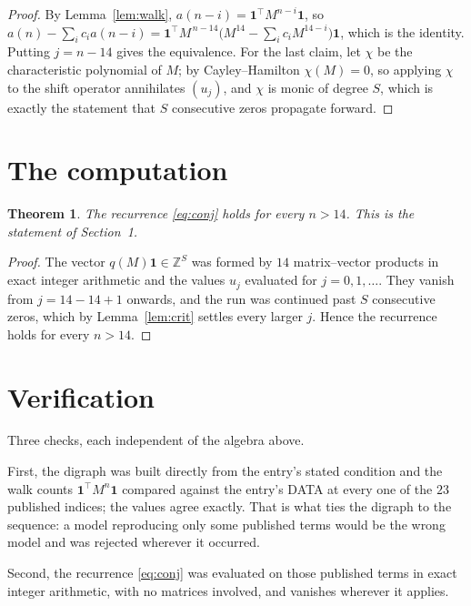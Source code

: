 \documentclass[11pt,a4paper]{article}
\theoremstyle{plain}
\newtheorem{theorem}{Theorem}
\theoremstyle{definition}
\begin{document}
\begin{proof}
By Lemma~\ref{lem:walk}, $a(n-i)=\mathbf{1}^{\!\top}M^{n-i}\mathbf{1}$, so
$a(n)-\sum_i c_i a(n-i)
=\mathbf{1}^{\!\top}M^{\,n-14}\bigl(M^{14}-\sum_i c_i M^{14-i}\bigr)
\mathbf{1}$, which is the identity. Putting $j=n-14$ gives the equivalence. For the
last claim, let $\chi$ be the characteristic polynomial of $M$; by Cayley--Hamilton
$\chi(M)=0$, so applying $\chi$ to the shift operator annihilates $(u_j)$, and $\chi$ is
monic of degree $S$, which is exactly the statement that $S$ consecutive zeros propagate
forward.
\end{proof}

\section{The computation}

\begin{theorem}
The recurrence \eqref{eq:conj} holds for every $n>14$. This is the statement of
Section~1.
\end{theorem}

\begin{proof}
The vector $q(M)\mathbf{1}\in\mathbb{Z}^{S}$ was formed by $14$ matrix--vector
products in exact integer arithmetic and the values $u_j$ evaluated for
$j=0,1,\dots$. They vanish from $j=14-14+1$ onwards, and the run was continued past
$S$ consecutive zeros, which by Lemma~\ref{lem:crit} settles every larger $j$. Hence the
recurrence holds for every $n>14$.
\end{proof}

\section{Verification}

Three checks, each independent of the algebra above.

First, the digraph was built directly from the entry's stated condition and the walk counts
$\mathbf{1}^{\!\top}M^{n}\mathbf{1}$ compared against the entry's DATA at every one of
the $23$ published indices; the values agree exactly. That is what ties the digraph to
the sequence: a model reproducing only some published terms would be the wrong model and
was rejected wherever it occurred.

Second, the recurrence \eqref{eq:conj} was evaluated on those published terms in exact
integer arithmetic, with no matrices involved, and vanishes wherever it applies.
\end{document}
